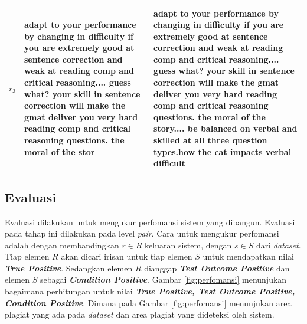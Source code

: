 \documentclass[../Book.tex]{subfiles}
\begin{document}
\begin{longtable}{@{}lp{7cm}p{7cm}@{}}
			$r_{3}$ & adapt to your performance by changing in difficulty   if you are extremely good at sentence correction and weak at reading comp and critical reasoning.... guess what? your skill in sentence correction will make the gmat deliver you very hard reading comp and critical reasoning questions. the moral of the stor                                                                                                                                                                                                                                                                                                                        & adapt to your performance by changing in difficulty   if you are extremely good at sentence correction and weak at reading comp and critical reasoning.... guess what? your skill in sentence correction will make the gmat deliver you very hard reading comp and critical reasoning questions. the moral of the story.... be balanced on verbal and skilled at all three question types.how the cat impacts verbal difficult                                                                                                                                                                                                                                                                                                                                                                                                                                                                                                                                                                            \\ \hline
		\end{longtable}

	\subsection{Evaluasi}
	Evaluasi dilakukan untuk mengukur perfomansi sistem yang dibangun. Evaluasi pada tahap ini dilakukan pada level \textit{pair}. Cara untuk mengukur perfomansi adalah dengan membandingkan $r \in R$ keluaran sistem, dengan $s \in S$ dari \textit{dataset}. Tiap elemen $R$ akan dicari irisan untuk tiap elemen $S$ untuk mendapatkan nilai \textit{\textbf{True Positive}}. Sedangkan elemen $R$ dianggap \textit{\textbf{Test Outcome Positive}} dan elemen $S$ sebagai \textit{\textbf{Condition Positive}}. Gambar \ref{fig:perfomansi} menunjukan bagaimana perhitungan untuk nilai \textit{\textbf{True Positive, Test Outcome Positive, Condition Positive}}. Dimana pada Gambar \ref{fig:perfomansi} menunjukan area plagiat yang ada pada \textit{dataset} dan area plagiat yang dideteksi oleh sistem.
	
\end{document}
